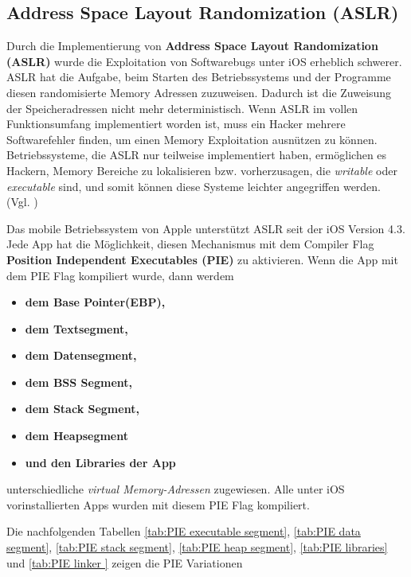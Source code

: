 \subsection{Address Space Layout Randomization (ASLR)}
\label{sec:ASLR}

Durch die Implementierung von \textbf{Address Space Layout Randomization (ASLR)} wurde die Exploitation von Softwarebugs unter iOS erheblich schwerer. ASLR hat die Aufgabe, beim Starten des Betriebssystems und der Programme diesen randomisierte Memory Adressen zuzuweisen. Dadurch ist die Zuweisung der Speicheradressen nicht mehr deterministisch. Wenn ASLR im vollen Funktionsumfang implementiert worden ist, muss ein Hacker mehrere Softwarefehler finden, um einen Memory Exploitation ausnützen zu können. Betriebssysteme, die ASLR nur teilweise implementiert haben, ermöglichen es Hackern, Memory Bereiche zu lokalisieren bzw. vorherzusagen, die \textit{\glqq writable\grqq{}} oder \textit{\glqq executable\grqq{}} sind, und somit können diese Systeme leichter angegriffen werden. (Vgl. \cite{Apple[4], ASLR[1], ASLR[2], ASLR[3], ASLR[4]})	 \par

Das mobile Betriebssystem von Apple unterstützt ASLR seit der iOS Version 4.3. Jede App hat die Möglichkeit, diesen Mechanismus mit dem Compiler Flag \textbf{Position Independent Executables (PIE)} zu aktivieren. Wenn die App mit dem PIE Flag kompiliert wurde, dann werdem
\begin{itemize}
    \item \textbf{dem Base Pointer(EBP),}
    \item \textbf{dem Textsegment,} 
    \item \textbf{dem Datensegment,}
    \item \textbf{dem BSS Segment,} 
    \item \textbf{dem Stack Segment,}
    \item \textbf{dem Heapsegment}
    \item \textbf{und den Libraries der App}
\end{itemize}
unterschiedliche \textit{\glqq virtual Memory-Adressen\grqq{}} zugewiesen. Alle unter iOS vorinstallierten Apps wurden mit diesem PIE Flag kompiliert. 

Die nachfolgenden Tabellen \ref{tab:PIE executable segment}, \ref{tab:PIE data segment}, \ref{tab:PIE stack segment}, \ref{tab:PIE heap segment}, \ref{tab:PIE libraries} und \ref{tab:PIE linker } zeigen die PIE Variationen

